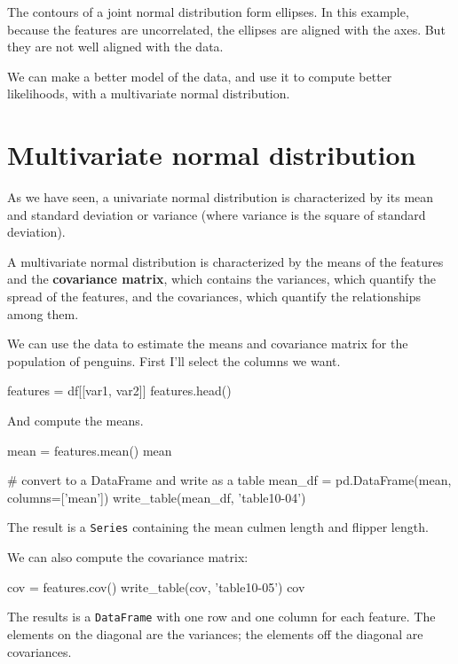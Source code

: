 \documentclass[12pt]{book}
\theoremstyle{exercise}
\newcommand{\py}[1]{{\tt #1}}%
\begin{document}
The contours of a joint normal distribution form ellipses.
In this example, because the features are uncorrelated, the ellipses are
aligned with the axes. But they are not well aligned with the data.

We can make a better model of the data, and use it to compute better
likelihoods, with a multivariate normal distribution.


\section{Multivariate normal distribution}
\label{multivariate-normal-distribution}

As we have seen, a univariate normal distribution is characterized by
its mean and standard deviation or variance (where variance is the
square of standard deviation).

A multivariate normal distribution is characterized by the means of the
features and the \textbf{covariance matrix}, which contains the
variances, which quantify the spread of the features, and the
covariances, which quantify the relationships among them.

We can use the data to estimate the means and covariance matrix for the
population of penguins. First I'll select the columns we want.

\begin{code}
features = df[[var1, var2]]
features.head()
\end{code}

And compute the means.

\begin{code}
mean = features.mean()
mean
\end{code}

\begin{code}
# convert to a DataFrame and write as a table
mean_df = pd.DataFrame(mean, columns=['mean'])
write_table(mean_df, 'table10-04')
\end{code}

The result is a \py{Series} containing the mean
culmen length and flipper length.

We can also compute the covariance matrix:

\begin{code}
cov = features.cov()
write_table(cov, 'table10-05')
cov
\end{code}

The results is a \py{DataFrame} with one row and
one column for each feature. The elements on the diagonal are the
variances; the elements off the diagonal are covariances.
\end{document}
